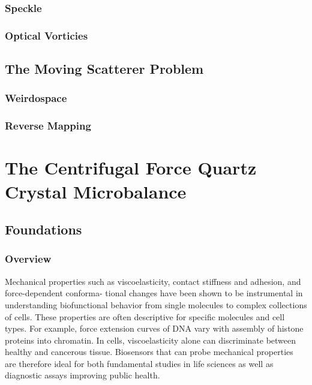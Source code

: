 \documentclass[a4paper,titlepage,onecolumn]{report}
\begin{document}
\section{Speckle}
\section{Optical Vorticies}

\chapter{The Moving Scatterer Problem}
\section{Weirdospace}
\section{Reverse Mapping}




\part{The Centrifugal Force Quartz Crystal Microbalance}
\label{part:qcm}
\chapter{Foundations}
\section{Overview}
Mechanical properties such as viscoelasticity, contact stiffness and
adhesion, and force-dependent conforma- tional changes have been shown to
be instrumental in understanding biofunctional behavior from single
molecules to complex collections of cells. These properties are often
descriptive for specific molecules and cell types. For example, force
extension curves of DNA vary with assembly of histone proteins into
chromatin. In cells, viscoelasticity alone can discriminate between
healthy and cancerous tissue. Biosensors that can probe mechanical
properties are therefore ideal for both fundamental studies in life
sciences as well as diagnostic assays improving public health.
\end{document}
